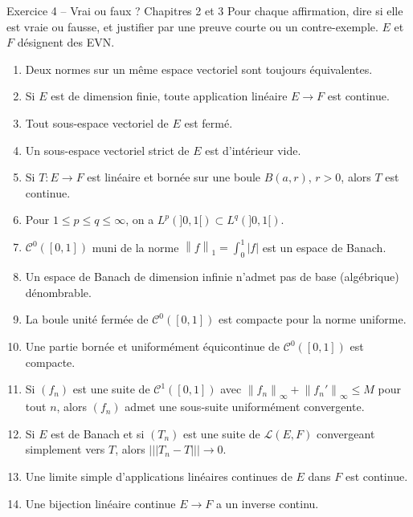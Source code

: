 \documentclass[11pt,a4paper]{article}
\newcommand{\norm}[1]{\left\|#1\right\|}
\newcommand{\opnorm}[1]{|\!|\!|#1|\!|\!|}
\newcommand{\Lc}{\mathcal{L}}
\newcommand{\Cz}{\mathcal{C}^0}
\theoremstyle{definition}
\begin{document}
\begin{exo}{Exercice 4 -- Vrai ou faux ? Chapitres 2 et 3}
Pour chaque affirmation, dire si elle est vraie ou fausse, et justifier par une preuve courte ou un contre-exemple. $E$ et $F$ désignent des EVN.
\begin{enumerate}[label=\arabic*.]
  \item Deux normes sur un même espace vectoriel sont toujours équivalentes.
  \item Si $E$ est de dimension finie, toute application linéaire $E\to F$ est continue.
  \item Tout sous-espace vectoriel de $E$ est fermé.
  \item Un sous-espace vectoriel strict de $E$ est d'intérieur vide.
  \item Si $T:E\to F$ est linéaire et bornée sur une boule $B(a,r)$, $r>0$, alors $T$ est continue.
  \item Pour $1\le p\le q\le\infty$, on a $L^p(]0,1[)\subset L^q(]0,1[)$.
  \item $\Cz([0,1])$ muni de la norme $\norm f_1=\int_0^1|f|$ est un espace de Banach.
  \item Un espace de Banach de dimension infinie n'admet pas de base (algébrique) dénombrable.
  \item La boule unité fermée de $\Cz([0,1])$ est compacte pour la norme uniforme.
  \item Une partie bornée et uniformément équicontinue de $\Cz([0,1])$ est compacte.
  \item Si $(f_n)$ est une suite de $\mathcal C^1([0,1])$ avec $\norm{f_n}_\infty+\norm{f_n'}_\infty\le M$ pour tout $n$, alors $(f_n)$ admet une sous-suite uniformément convergente.
  \item Si $E$ est de Banach et si $(T_n)$ est une suite de $\Lc(E,F)$ convergeant simplement vers $T$, alors $\opnorm{T_n-T}\to0$.
  \item Une limite simple d'applications linéaires continues de $E$ dans $F$ est continue.
  \item Une bijection linéaire continue $E\to F$ a un inverse continu.
\end{enumerate}
\end{exo}
\end{document}
